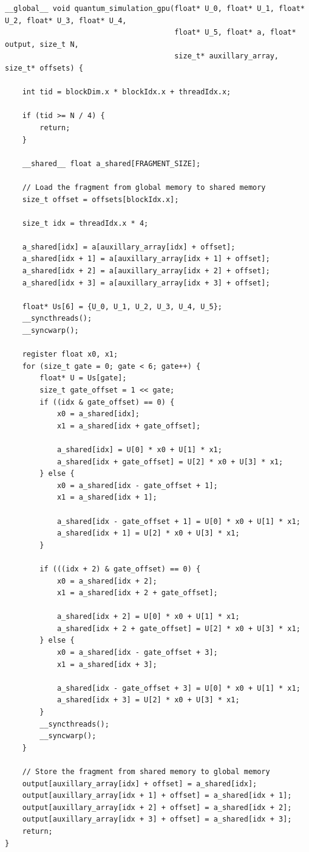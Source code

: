 \documentclass{article}
\begin{document}
\begin{verbatim}
__global__ void quantum_simulation_gpu(float* U_0, float* U_1, float* U_2, float* U_3, float* U_4,
                                       float* U_5, float* a, float* output, size_t N,
                                       size_t* auxillary_array, size_t* offsets) {

    int tid = blockDim.x * blockIdx.x + threadIdx.x;

    if (tid >= N / 4) {
        return;
    }

    __shared__ float a_shared[FRAGMENT_SIZE];

    // Load the fragment from global memory to shared memory
    size_t offset = offsets[blockIdx.x];

    size_t idx = threadIdx.x * 4;

    a_shared[idx] = a[auxillary_array[idx] + offset];
    a_shared[idx + 1] = a[auxillary_array[idx + 1] + offset];
    a_shared[idx + 2] = a[auxillary_array[idx + 2] + offset];
    a_shared[idx + 3] = a[auxillary_array[idx + 3] + offset];

    float* Us[6] = {U_0, U_1, U_2, U_3, U_4, U_5};
    __syncthreads();
    __syncwarp();

    register float x0, x1;
    for (size_t gate = 0; gate < 6; gate++) {
        float* U = Us[gate];
        size_t gate_offset = 1 << gate;
        if ((idx & gate_offset) == 0) {
            x0 = a_shared[idx];
            x1 = a_shared[idx + gate_offset];

            a_shared[idx] = U[0] * x0 + U[1] * x1;
            a_shared[idx + gate_offset] = U[2] * x0 + U[3] * x1;
        } else {
            x0 = a_shared[idx - gate_offset + 1];
            x1 = a_shared[idx + 1];

            a_shared[idx - gate_offset + 1] = U[0] * x0 + U[1] * x1;
            a_shared[idx + 1] = U[2] * x0 + U[3] * x1;
        }

        if (((idx + 2) & gate_offset) == 0) {
            x0 = a_shared[idx + 2];
            x1 = a_shared[idx + 2 + gate_offset];

            a_shared[idx + 2] = U[0] * x0 + U[1] * x1;
            a_shared[idx + 2 + gate_offset] = U[2] * x0 + U[3] * x1;
        } else {
            x0 = a_shared[idx - gate_offset + 3];
            x1 = a_shared[idx + 3];

            a_shared[idx - gate_offset + 3] = U[0] * x0 + U[1] * x1;
            a_shared[idx + 3] = U[2] * x0 + U[3] * x1;
        }
        __syncthreads();
        __syncwarp();
    }

    // Store the fragment from shared memory to global memory
    output[auxillary_array[idx] + offset] = a_shared[idx];
    output[auxillary_array[idx + 1] + offset] = a_shared[idx + 1];
    output[auxillary_array[idx + 2] + offset] = a_shared[idx + 2];
    output[auxillary_array[idx + 3] + offset] = a_shared[idx + 3];
    return;
}
\end{verbatim}
\end{document}
